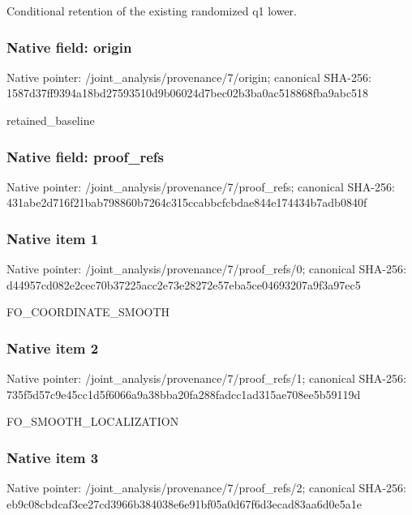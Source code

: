 \documentclass[10pt,a4paper]{article}
\begin{document}
\begingroup\raggedright\sloppy Conditional retention of the existing randomized q1 lower.\par\endgroup

\subsubsection{Native field: origin}
Native pointer: /joint\_\allowbreak{}analysis/provenance/7/origin; canonical SHA-256: 1587d37ff9394a18bd27593510d9b06024d7bec02b3ba0ac518868fba9abc518

\begingroup\raggedright\sloppy retained\_\allowbreak{}baseline\par\endgroup

\subsubsection{Native field: proof\_\allowbreak{}refs}
Native pointer: /joint\_\allowbreak{}analysis/provenance/7/proof\_\allowbreak{}refs; canonical SHA-256: 431abe2d716f21bab798860b7264c315ccabbcfcbdae844e174434b7adb0840f

\subsubsection{Native item 1}
Native pointer: /joint\_\allowbreak{}analysis/provenance/7/proof\_\allowbreak{}refs/0; canonical SHA-256: d44957cd082e2cec70b37225acc2e73e28272e57eba5ce04693207a9f3a97ec5

\begingroup\raggedright\sloppy FO\_\allowbreak{}COORDINATE\_\allowbreak{}SMOOTH\par\endgroup

\subsubsection{Native item 2}
Native pointer: /joint\_\allowbreak{}analysis/provenance/7/proof\_\allowbreak{}refs/1; canonical SHA-256: 735f5d57c9e45cc1d5f6066a9a38bba20fa288fadcc1ad315ae708ee5b59119d

\begingroup\raggedright\sloppy FO\_\allowbreak{}SMOOTH\_\allowbreak{}LOCALIZATION\par\endgroup

\subsubsection{Native item 3}
Native pointer: /joint\_\allowbreak{}analysis/provenance/7/proof\_\allowbreak{}refs/2; canonical SHA-256: eb9c08cbdcaf3ce27cd3966b384038e6e91bf05a0d67f6d3ecad83aa6d0e5a1e
\end{document}
